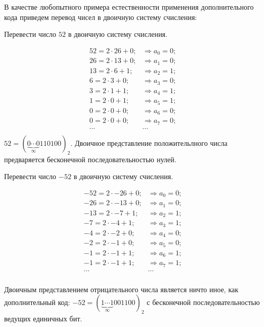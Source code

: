 В качестве любопытного примера естественности применения дополнительного кода приведем перевод чисел в двоичную систему счисления:
\begin{Example}
    Перевести число $52$ в двоичную систему счисления.
\end{Example}
\begin{Solve}
    \[
        \begin{array}{ll}
            52 = 2\cdot 26 + 0; & \Rightarrow a_0 = 0; \\
            26 = 2\cdot 13 + 0; & \Rightarrow a_1 = 0; \\
            13 = 2\cdot 6 + 1;  & \Rightarrow a_2 = 1; \\
            6  = 2\cdot 3 + 0;  & \Rightarrow a_3 = 0; \\
            3  = 2\cdot 1 + 1;  & \Rightarrow a_4 = 1; \\
            1  = 2\cdot 0 + 1;  & \Rightarrow a_5 = 1; \\
            0  = 2\cdot 0 + 0;  & \Rightarrow a_6 = 0; \\
            0  = 2\cdot 0 + 0;  & \Rightarrow a_7 = 0; \\
            \cdots              & \cdots \\
        \end{array}
    \]
    $52=(\underbrace{0\cdots 0}_{\infty}110100)_2$. Двоичное представление положительлного числа предваряется бесконечной последовательностью нулей.
\end{Solve}

\begin{Example}
    Перевести число ${-52}$ в двоичную систему счисления.
\end{Example}
\begin{Solve}
    \[
        \begin{array}{ll}
            {-52} = 2\cdot {-26} + 0; & \Rightarrow a_0 = 0; \\
            {-26} = 2\cdot {-13} + 0; & \Rightarrow a_1 = 0; \\
            {-13} = 2\cdot {-7} + 1;  & \Rightarrow a_2 = 1; \\
            {-7}  = 2\cdot {-4} + 1;  & \Rightarrow a_3 = 1; \\
            {-4}  = 2\cdot {-2} + 0;  & \Rightarrow a_4 = 0; \\
            {-2}  = 2\cdot {-1} + 0;  & \Rightarrow a_5 = 0; \\
            {-1}  = 2\cdot {-1} + 1;  & \Rightarrow a_6 = 1; \\
            {-1}  = 2\cdot {-1} + 1;  & \Rightarrow a_7 = 1; \\
            \cdots              & \cdots \\
        \end{array}
    \]
    
    Двоичным представлением отрицательного числа является ничто иное, как дополнительный код: ${-52}=(\underbrace{1\cdots 1}_{\infty}001100)_2$ с бесконечной последовательностью ведущих единичных бит.
\end{Solve}


